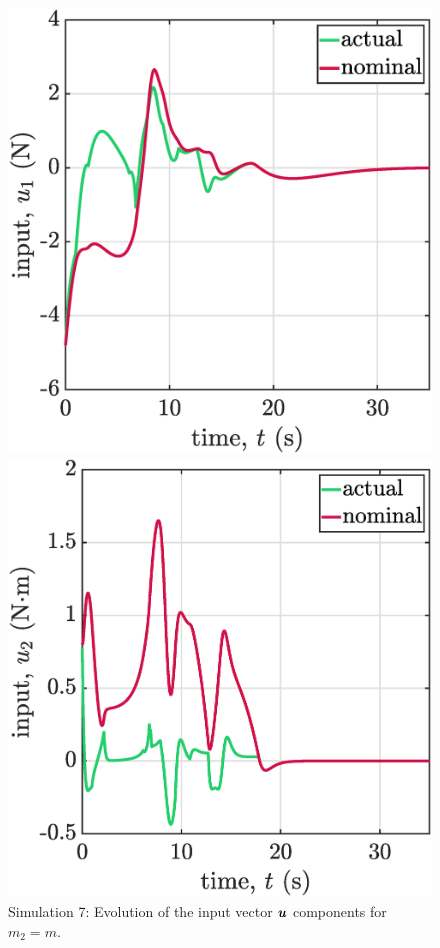 \begin{figure}[p]
\begin{minipage}[t]{.45\textwidth}
    \end{minipage}  
    \caption{\label{fig:sim7um}Simulation 7: Evolution of the input vector $\boldsymbol{u}$ components for $m_2=m$.}
    
    \begin{minipage}[t]{.45\textwidth}
        \centering
        \includegraphics[width=\textwidth]{figures/sim7u13.eps}
    \end{minipage}
    \hfill
    \begin{minipage}[t]{.45\textwidth}
        \centering
        \includegraphics[width=\textwidth]{figures/sim7u23.eps}

\end{minipage}
\end{figure}
